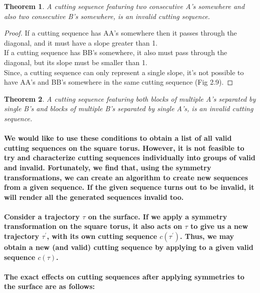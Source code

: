 \documentclass{report}
\newtheorem{theorem}{Theorem}
\begin{document}
\begin{theorem}
A cutting sequence featuring two consecutive A’s somewhere and also two consecutive B’s somewhere, is an invalid cutting sequence.
\end{theorem}

\begin{proof}
If a cutting sequence has AA’s somewhere then it passes through the diagonal, and it must have a slope greater than 1. \\ 
If a cutting sequence has BB’s somewhere, it also must pass through the diagonal, but its slope must be smaller than 1. \\ 
Since, a cutting sequence can only represent a single slope, it's not possible to have AA’s and BB’s somewhere in the same cutting sequence (Fig 2.9).
\end{proof}

\begin{theorem}
A cutting sequence featuring both blocks of multiple A’s separated by single B’s and blocks of multiple B’s separated by single A’s, is an invalid cutting sequence.
\end{theorem}

\paragraph{We would like to use these conditions to obtain a list of all valid cutting sequences on the square torus. However, it is not feasible to try and characterize cutting sequences individually into groups of valid and invalid. Fortunately, we find that, using the symmetry transformations, we can create an algorithm to create new sequences from a given sequence. If the given sequence turns out to be invalid, it will render all the generated sequences invalid too.}

\paragraph{Consider a trajectory $\tau$ on the surface. If we apply a symmetry transformation  on the square torus, it also acts on $\tau$ to give us a new trajectory $\tau^{'}$, with its own cutting sequence $c(\tau^{'})$. Thus, we may obtain a new (and valid) cutting sequence by applying  to a given valid sequence  $c(\tau)$.}

\paragraph{The exact effects on cutting sequences after applying symmetries to the surface are as follows:}
\end{document}
